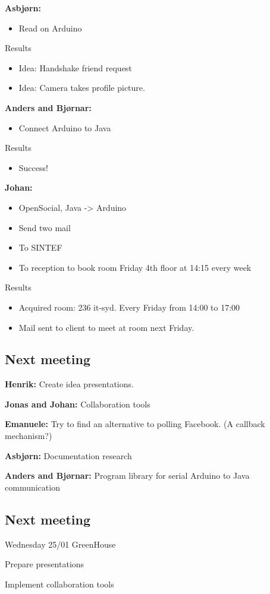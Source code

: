 {\bf Asbjørn: } \newline
\begin{itemize}
\item Read on Arduino
\end{itemize}

Results
\begin{itemize}
\item Idea: Handshake friend request
\item Idea: Camera takes profile picture.
\end{itemize}


{\bf Anders and Bjørnar: } \newline
\begin{itemize}
\item Connect Arduino to Java
\end{itemize}

Results
\begin{itemize}
\item Success!
\end{itemize}

{\bf Johan: } \newline
\begin{itemize}
\item OpenSocial, Java -> Arduino
\item Send two mail
\item To SINTEF
\item To reception to book room Friday 4th floor at 14:15 every week
\end{itemize}

Results
\begin{itemize}
\item Acquired room: 236 it-syd. Every Friday from 14:00 to 17:00
\item Mail sent to client to meet at room next Friday.
\end{itemize}

\subsection{Next meeting}

{\bf Henrik: } \newline
Create idea presentations.

{\bf Jonas and Johan: } \newline
Collaboration tools

{\bf Emanuele: } \newline
Try to find an alternative to polling Facebook. (A callback mechanism?)

{\bf Asbjørn: } \newline
Documentation research

{\bf Anders and Bjørnar: } \newline
Program library for serial Arduino to Java communication

\subsection{Next meeting}
Wednesday 25/01 GreenHouse

Prepare presentations

Implement collaboration tools
